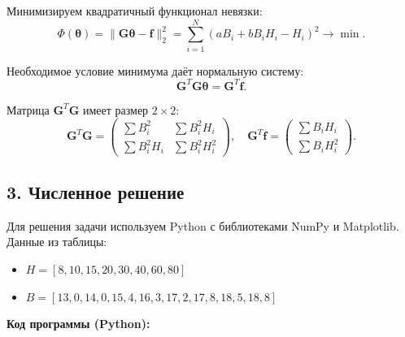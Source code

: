 \documentclass{article}
\begin{document}
Минимизируем квадратичный функционал невязки:
\begin{equation}
\Phi(\boldsymbol{\theta}) = \|\mathbf{G}\boldsymbol{\theta} - \mathbf{f}\|_2^2 = \sum_{i=1}^{N} (a B_i + b B_i H_i - H_i)^2 \to \min.
\end{equation}

Необходимое условие минимума даёт нормальную систему:
\begin{equation}
\mathbf{G}^T \mathbf{G} \boldsymbol{\theta} = \mathbf{G}^T \mathbf{f}.
\label{eq:44_normal}
\end{equation}

Матрица $\mathbf{G}^T \mathbf{G}$ имеет размер $2 \times 2$:
\begin{equation}
\mathbf{G}^T \mathbf{G} =
\begin{pmatrix}
\sum B_i^2 & \sum B_i^2 H_i \\
\sum B_i^2 H_i & \sum B_i^2 H_i^2
\end{pmatrix}, \quad
\mathbf{G}^T \mathbf{f} =
\begin{pmatrix}
\sum B_i H_i \\
\sum B_i H_i^2
\end{pmatrix}.
\end{equation}

\subsection*{3. Численное решение}

Для решения задачи используем Python с библиотеками NumPy и Matplotlib. Данные из таблицы:
\begin{itemize}
\item $H = [8, 10, 15, 20, 30, 40, 60, 80]$
\item $B = [13{,}0, 14{,}0, 15{,}4, 16{,}3, 17{,}2, 17{,}8, 18{,}5, 18{,}8]$
\end{itemize}

\textbf{Код программы (Python):}
\end{document}

